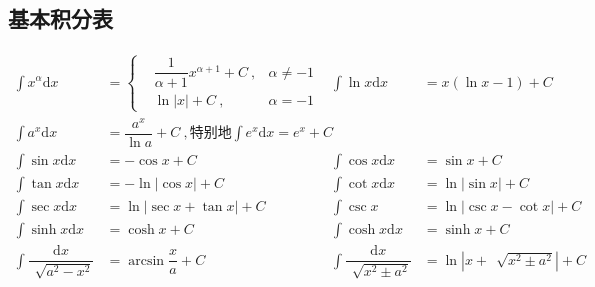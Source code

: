 \documentclass[zihao=-4,linespread=1.8,UTF8,nothm]{aytony_base}
\theoremstyle{definition}
\begin{document}
\begin{appendices}
    \section{基本积分表}
    $$
        \begin{aligned}
            \int x^\alpha \mathrm{d}x                      & = \left\{
            \begin{aligned}
                 & \dfrac{1}{\alpha + 1}x^{\alpha + 1} + C\ , & \alpha \neq -1 \\
                 & \ln |x| + C\ ,                             & \alpha = -1
            \end{aligned}
            \right.                                        & \int \ln x \mathrm{d}x                                                                       & = x(\ln x - 1) + C                                                                        \\
            \int a^x \mathrm{d}x                           & = \dfrac{a^x}{\ln a} + C\ ,\text{特别地} \int e^x \mathrm{d}x = e^x + C                      &                                                  &                                        \\
            \int \sin x \mathrm{d}x                        & = -\cos x + C                                                                                & \int \cos x \mathrm{d}x                          & = \sin x + C                           \\
            \int \tan x \mathrm{d}x                        & = -\ln|\cos x| + C                                                                           & \int \cot x \mathrm{d}x                          & = \ln |\sin x| + C                     \\
            \int \sec x \mathrm{d}x                        & = \ln |\sec x + \tan x| + C                                                                  & \int \csc x                                      & = \ln |\csc x - \cot x| + C            \\
            \int \sinh x \mathrm{d}x                       & = \cosh x + C                                                                                & \int \cosh x \mathrm{d}x                         & = \sinh x + C                          \\
            \int \dfrac{\mathrm{d}x}{\,\sqrt[]{a^2 - x^2}} & = \arcsin \dfrac{x}{a} + C                                                                   & \int \dfrac{\mathrm{d}x}{\,\sqrt[]{x^2 \pm a^2}} & = \ln |x + \,\sqrt[]{x^2 \pm a^2}| + C \\

\end{aligned}$$
\end{appendices}
\end{document}
